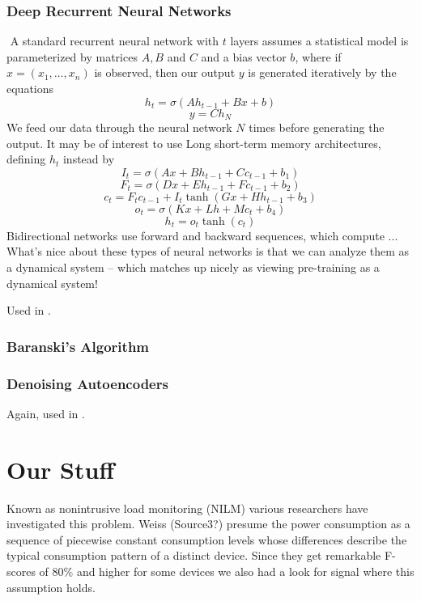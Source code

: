 \documentclass{article}
\begin{document}
\subsubsection{Deep Recurrent Neural Networks}
​
A standard recurrent neural network with $t$ layers assumes a statistical model is parameterized by matrices $A,B$ and $C$ and a bias vector $b$, where if $x = (x_1, \dots, x_n)$ is observed, then our output $y$ is generated iteratively by the equations
%
\[ h_t = \sigma(A h_{t-1} + B x + b) \]
%
\[ y = C h_N \]
%
We feed our data through the neural network $N$ times before generating the output.
It may be of interest to use Long short-term memory architectures, defining $h_t$ instead by
%
\[ I_t = \sigma(Ax + B h_{t-1} + C c_{t-1} + b_1) \]
%
\[ F_t = \sigma(Dx + E h_{t-1} + F c_{t-1} + b_2) \]
%
\[ c_t = F_t c_{t-1} + I_t \tanh(G x + H h_{t-1} + b_3) \]
%
\[ o_t = \sigma(K x + L h + M c_t + b_4) \]
%
\[ h_t = o_t \tanh(c_t) \]
​
Bidirectional networks use forward and backward sequences, which compute ...
​
What's nice about these types of neural networks is that we can analyze them as a dynamical system -- which matches up nicely as viewing pre-training as a dynamical system!

Used in \cite{Kelly}.

\subsubsection{Baranski's Algorithm}

\subsubsection{Denoising Autoencoders}

Again, used in \cite{Kelly}.



\section{Our Stuff}

Known as nonintrusive load monitoring (NILM) various researchers have investigated this problem.
Weiss (Source3?) presume the power consumption as a sequence of piecewise constant consumption levels whose differences describe the typical consumption pattern of a distinct device.
Since they get remarkable F-scores of 80\% and higher for some devices we also had a look for signal where this assumption holds.
\end{document}
